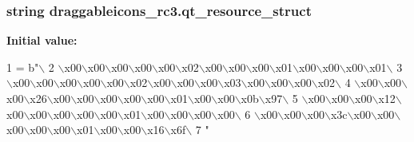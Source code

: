 \subsubsection[{qt\+\_\+resource\+\_\+struct}]{\setlength{\rightskip}{0pt plus 5cm}string draggableicons\+\_\+rc3.\+qt\+\_\+resource\+\_\+struct}\label{namespacedraggableicons__rc3_ac53880968b529f8f839055818d51300b}
{\bfseries Initial value\+:}
\begin{DoxyCode}
1 = b\textcolor{stringliteral}{"\(\backslash\)}
2 \textcolor{stringliteral}{\(\backslash\)x00\(\backslash\)x00\(\backslash\)x00\(\backslash\)x00\(\backslash\)x00\(\backslash\)x02\(\backslash\)x00\(\backslash\)x00\(\backslash\)x00\(\backslash\)x01\(\backslash\)x00\(\backslash\)x00\(\backslash\)x00\(\backslash\)x01\(\backslash\)}
3 \textcolor{stringliteral}{\(\backslash\)x00\(\backslash\)x00\(\backslash\)x00\(\backslash\)x00\(\backslash\)x00\(\backslash\)x02\(\backslash\)x00\(\backslash\)x00\(\backslash\)x00\(\backslash\)x03\(\backslash\)x00\(\backslash\)x00\(\backslash\)x00\(\backslash\)x02\(\backslash\)}
4 \textcolor{stringliteral}{\(\backslash\)x00\(\backslash\)x00\(\backslash\)x00\(\backslash\)x26\(\backslash\)x00\(\backslash\)x00\(\backslash\)x00\(\backslash\)x00\(\backslash\)x00\(\backslash\)x01\(\backslash\)x00\(\backslash\)x00\(\backslash\)x0b\(\backslash\)x97\(\backslash\)}
5 \textcolor{stringliteral}{\(\backslash\)x00\(\backslash\)x00\(\backslash\)x00\(\backslash\)x12\(\backslash\)x00\(\backslash\)x00\(\backslash\)x00\(\backslash\)x00\(\backslash\)x00\(\backslash\)x01\(\backslash\)x00\(\backslash\)x00\(\backslash\)x00\(\backslash\)x00\(\backslash\)}
6 \textcolor{stringliteral}{\(\backslash\)x00\(\backslash\)x00\(\backslash\)x00\(\backslash\)x3c\(\backslash\)x00\(\backslash\)x00\(\backslash\)x00\(\backslash\)x00\(\backslash\)x00\(\backslash\)x01\(\backslash\)x00\(\backslash\)x00\(\backslash\)x16\(\backslash\)x6f\(\backslash\)}
7 \textcolor{stringliteral}{"}
\end{DoxyCode}
